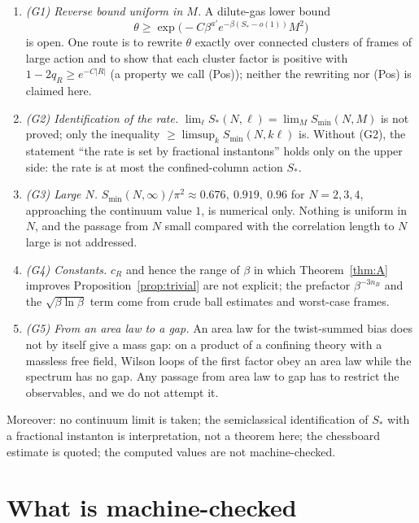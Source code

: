 \documentclass[11pt,a4paper]{article}
\theoremstyle{definition}
\theoremstyle{remark}
\begin{document}
\begin{enumerate}[leftmargin=*]
\item \emph{(G1) Reverse bound uniform in $M$.} A dilute-gas lower bound
\[ \theta\ge\exp\big(-C\beta^{a'}e^{-\beta(S_*-o(1))}M^2\big) \]
is open. One route is to rewrite $\theta$ exactly over connected clusters of frames of large action and to show that each cluster factor is positive with $1-2q_R\ge e^{-C|R|}$ (a property we call (Pos)); neither the rewriting nor (Pos) is claimed here.
\item \emph{(G2) Identification of the rate.} $\lim_\ell S_*(N,\ell)=\lim_MS_{\min}(N,M)$ is not proved; only the inequality $\ge\limsup_k S_{\min}(N,k\ell)$ is. Without (G2), the statement ``the rate is set by fractional instantons'' holds only on the upper side: the rate is at most the confined-column action $S_*$.
\item \emph{(G3) Large $N$.} $S_{\min}(N,\infty)/\pi^2\approx0.676,\ 0.919,\ 0.96$ for $N=2,3,4$, approaching the continuum value $1$, is numerical only. Nothing is uniform in $N$, and the passage from $N$ small compared with the correlation length to $N$ large is not addressed.
\item \emph{(G4) Constants.} $c_R$ and hence the range of $\beta$ in which Theorem~\ref{thm:A} improves Proposition~\ref{prop:trivial} are not explicit; the prefactor $\beta^{-3n_B}$ and the $\sqrt{\beta\ln\beta}$ term come from crude ball estimates and worst-case frames.
\item \emph{(G5) From an area law to a gap.} An area law for the twist-summed bias does not by itself give a mass gap: on a product of a confining theory with a massless free field, Wilson loops of the first factor obey an area law while the spectrum has no gap. Any passage from area law to gap has to restrict the observables, and we do not attempt it.
\end{enumerate}
Moreover: no continuum limit is taken; the semiclassical identification of $S_*$ with a fractional instanton is interpretation, not a theorem here; the chessboard estimate is quoted; the computed values are not machine-checked.

\section{What is machine-checked}\label{sec:lean}
\end{document}
